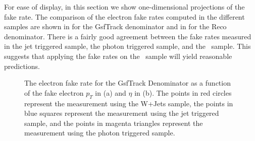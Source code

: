 \documentclass{cmspaper}
\begin{document}
For ease of display, in this section we show one-dimensional projections of the fake rate. The comparison of the electron fake rates computed in the different samples are shown in  for the GsfTrack denominator and in  for the Reco denominator. There is a fairly good agreement between the fake rates measured in the jet triggered sample, the photon triggered sample, and the \WPlusJets\ sample. This suggests that applying the fake rates on the \WPlusJets\ sample will yield reasonable predictions. 

\begin{figure}[htb]
  \begin{center}
    
    \caption{The electron fake rate for the GsfTrack Denominator as a function of the fake electron $p_T$ in (a) and $\eta$ in (b). The points in red circles represent the \epsilonFake measurement using the W+Jets sample, the points in blue squares represent the \epsilonFake measurement using the jet triggered sample, and the points in magenta triangles represent the \epsilonFake measurement using the photon triggered sample.}
    \label{fig:electronFakeRate_GsfTrack}
  \end{center}
\end{figure}
\end{document}
